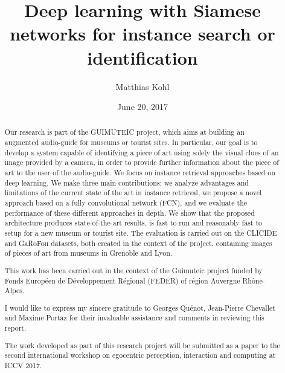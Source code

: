 \documentclass[12pt, a4paper]{memoir} %
\title{Deep learning with Siamese networks for instance search or identification} %
\author{Matthias Kohl}
\date{June 20, 2017} %
\begin{document}
\frontmatter
\begin{titlingpage}
\maketitle
\end{titlingpage}

\setlength{\parskip}{-1pt plus 1pt}

\renewcommand{\abstracttextfont}{\normalfont}
\abstractintoc
\begin{abstract}
Our research is part of the GUIMUTEIC project, which aims at building an augmented
audio-guide for museums or tourist sites. In particular, our goal is to
develop a system capable of identifying a
piece of art using solely
the visual clues of an image provided by a camera, in order to provide
further information about the piece of art to the user of the audio-guide.
We focus on instance retrieval approaches based on deep learning.
We make three main contributions:
we analyze advantages and limitations of the current state of the art
in instance retrieval,
we propose a novel approach based on a fully
convolutional network (FCN),
and we evaluate the performance of these different approaches in depth.
We show that the proposed architecture produces state-of-the-art results,
is fast to run and reasonably fast to setup for a new museum or
tourist site. The evaluation is carried out on the CLICIDE and GaRoFou
datasets, both created in the context of the project, containing images
of pieces of art from museums in Grenoble and Lyon.
\end{abstract}
\abstractintoc

\renewcommand\abstractname{Acknowledgement}
\begin{abstract}
This work has been carried out in the context of the Guimuteic project
funded by Fonds Européen de Développement Régional (FEDER) of région
Auvergne Rhône-Alpes.

I would like to express my sincere gratitude to Georges Quénot,
Jean-Pierre Chevallet and Maxime Portaz for their invaluable assistance
and comments in reviewing this report.
\end{abstract}

\renewcommand\abstractname{Publication}
\begin{abstract}
The work developed as part of this research project will be submitted as a
paper to the second international workshop on egocentric perception,
interaction and computing at ICCV 2017.
\end{abstract}
\end{document}

